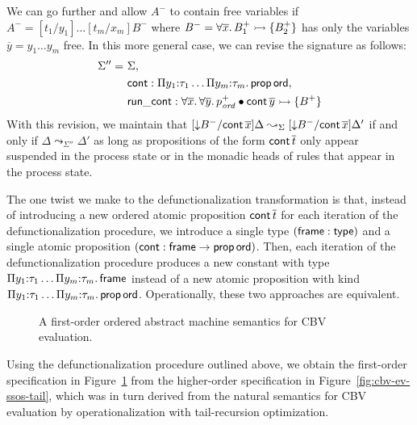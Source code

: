 We can go further and allow $A^-$ to contain free variables if
$A^- = [t_1/y_1]\ldots[t_m/x_m]B^-$ where $B^- = \forall
\overline{x}.\,B_1^+ \rightarrowtail \{ B_2^+ \}$ has only the variables
$\overline{y} = y_1\ldots y_m$ free.  In this more general case, we
can revise the signature as follows:
\begin{align*}
\Sigma'' = ~ & \Sigma,
\\    ~~ & {\sf cont} : 
       \Pi y_1{:}\tau_1\ldots \Pi y_m{:}\tau_m.\, {\sf prop\,ord},
\\    ~~ & {\sf run\_cont} : \forall \overline{x}.\,\forall \overline{y}.\,
       p^+_{\it ord} \mathbin{\bullet} {\sf cont}\,\overline{y} \rightarrowtail \{ B^+ \}
\end{align*}
With this revision, we maintain that
%
$[{\downarrow}B^-/{\sf cont}\,\overline{x}]\Delta \leadsto_{\Sigma}
[{\downarrow}B^-/{\sf cont}\,\overline{x}]\Delta'$ if and only if
$\Delta \leadsto_{\Sigma''} \Delta'$ as long as propositions of the
form ${\sf cont}\,\overline{t}$ only appear suspended in the process
state or in the monadic heads of rules that appear in the process
state.

The one twist we make to the defunctionalization transformation is
that, instead of introducing a new ordered atomic proposition ${\sf
  cont}\,\overline{t}$ for each iteration of the defunctionalization
procedure, we introduce a single type $({\sf frame} : {\sf type})$ and a
single atomic proposition $({\sf cont} : {\sf frame} \rightarrow {\sf
  prop\,ord})$. Then, each iteration of the defunctionalization
procedure produces a new constant with type $\Pi y_1{:}\tau_1\ldots
\Pi y_m{:}\tau_m.\, {\sf frame}$ instead of a new atomic proposition
with kind $\Pi y_1{:}\tau_1\ldots \Pi y_m{:}\tau_m.\, {\sf
  prop\,ord}$.  Operationally, these two approaches are equivalent.

\begin{figure}
\caption{A first-order ordered abstract machine semantics for CBV
  evaluation.}
\label{fig:cbv-ev-ssos-fun}
\end{figure}

Using the defunctionalization procedure outlined above, we obtain the
first-order specification in Figure~\ref{fig:cbv-ev-ssos-fun} from the
higher-order specification in Figure~\ref{fig:cbv-ev-ssos-tail}, which
was in turn derived from the natural semantics for CBV evaluation by
operationalization with tail-recursion optimization.

